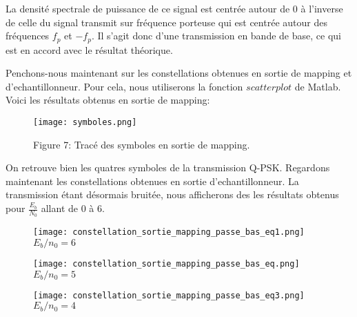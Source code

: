 \documentclass[englishb]{article}
\begin{document}
La densité spectrale de puissance  de ce signal est centrée autour de 0 à l'inverse de celle du signal transmit sur fréquence porteuse qui est centrée autour des fréquences $f_p$ et $-f_p$. Il s’agit donc d’une transmission en bande de base, ce qui est en accord avec le résultat théorique.


Penchons-nous maintenant sur les constellations obtenues en sortie de mapping et d'echantillonneur. Pour cela, nous utiliserons la fonction $scatterplot$ de Matlab. Voici les résultats obtenus en sortie de mapping:

\begin{figure}[H]
    \centering
    \texttt{[image: symboles.png]}
    
    Figure 7: Tracé des symboles en sortie de mapping.
\end{figure}


On retrouve bien les quatres symboles de la transmission Q-PSK. 
Regardons maintenant les constellations obtenues en sortie d'echantillonneur. La transmission étant désormais bruitée, nous afficherons des les résultats obtenus pour $\frac{E_b}{N_0}$ allant de 0 à 6.



\begin{figure}[H]
    \centering
   \begin{minipage}[b]{0.3\linewidth}
      \centering \texttt{[image: constellation\_sortie\_mapping\_passe\_bas\_eq1.png]}
      $E_b/n_0=6$
   \end{minipage}\hfill
   \begin{minipage}[b]{0.3\linewidth}   
      \centering \texttt{[image: constellation\_sortie\_mapping\_passe\_bas\_eq.png]}
      $E_b/n_0=5$
   \end{minipage}
   \begin{minipage}[b]{0.35\linewidth}   
      \centering \texttt{[image: constellation\_sortie\_mapping\_passe\_bas\_eq3.png]}
      $E_b/n_0=4$
   \end{minipage}
\end{figure}
\end{document}
